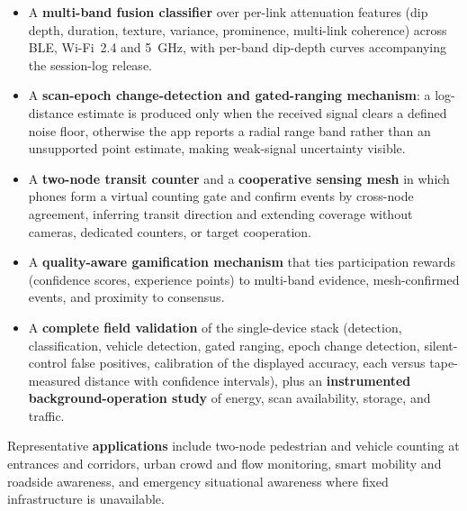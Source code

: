 \documentclass[journal,10pt]{IEEEtran}
\begin{document}
\begin{itemize}
\item A \textbf{multi-band fusion classifier} over per-link attenuation
features (dip depth, duration, texture, variance, prominence, multi-link
coherence) across BLE, Wi-Fi~2.4 and 5~GHz, with per-band dip-depth
curves accompanying the session-log release.

\item A \textbf{scan-epoch change-detection and gated-ranging mechanism}: a
log-distance estimate is produced only when the received signal clears a
defined noise floor, otherwise the app reports a radial range band rather
than an unsupported point estimate, making weak-signal uncertainty visible.

\item A \textbf{two-node transit counter} and a \textbf{cooperative sensing
mesh} in which phones form a virtual counting gate and confirm events by
cross-node agreement, inferring transit direction and extending coverage
without cameras, dedicated counters, or target cooperation.

\item A \textbf{quality-aware gamification mechanism} that ties
participation rewards (confidence scores, experience points) to multi-band
evidence, mesh-confirmed events, and proximity to consensus.

\item A \textbf{complete field validation} of the single-device stack
(detection, classification, vehicle detection, gated ranging, epoch change
detection, silent-control false positives, calibration of the displayed
accuracy, each versus tape-measured distance with confidence intervals),
plus an \textbf{instrumented background-operation study} of energy, scan
availability, storage, and traffic.
\end{itemize}

Representative \textbf{applications} include two-node pedestrian and vehicle
counting at entrances and corridors, urban crowd and flow monitoring, smart
mobility and roadside awareness, and emergency situational awareness where
fixed infrastructure is unavailable.
\end{document}
